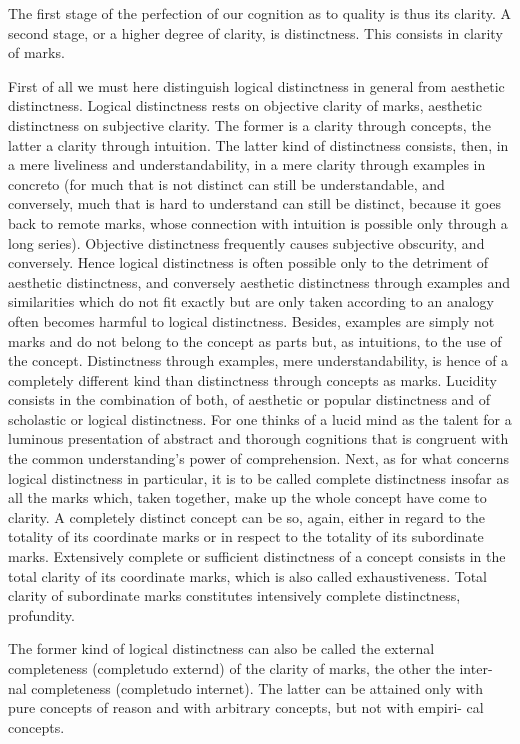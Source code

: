 The first stage of the perfection of our cognition
as to quality is thus its clarity.
A second stage, or a higher degree of clarity, is distinctness.
This consists in clarity of marks.

First of all we must here distinguish
logical distinctness in general from aesthetic distinctness.
Logical distinctness rests on objective clarity of marks,
aesthetic distinctness on subjective clarity.
The former is a clarity through concepts,
the latter a clarity through intuition.
The latter kind of distinctness consists, then,
in a mere liveliness and understandability,
in a mere clarity through examples in concreto
(for much that is not distinct
can still be understandable,
and conversely, much that is hard to understand
can still be distinct,
because it goes back to remote marks,
whose connection with intuition
is possible only through a long series).
Objective distinctness frequently causes
subjective obscurity, and conversely.
Hence logical distinctness is often possible
only to the detriment of aesthetic distinctness,
and conversely aesthetic distinctness
through examples and similarities
which do not fit exactly but are only
taken according to an analogy often becomes harmful to logical distinctness.
Besides, examples are simply not marks and do not belong to the
concept as parts but, as intuitions, to the use of the concept.
Distinctness through examples, mere understandability, is hence
of a completely different kind than distinctness through concepts as marks.
Lucidity consists in the combination of both,
of aesthetic or popular distinctness and
of scholastic or logical distinctness.
For one thinks of a lucid mind as the talent for a
luminous presentation of abstract and thorough cognitions
that is congruent with the common understanding's power of comprehension.
Next, as for what concerns logical distinctness in particular,
it is to be called complete distinctness insofar as all the marks
which, taken together, make up the whole concept have come to clarity.
A completely distinct concept can be so, again,
either in regard to the totality of its coordinate marks or
in respect to the totality of its subordinate marks.
Extensively complete or sufficient distinctness of a concept
consists in the total clarity of its coordinate marks,
which is also called exhaustiveness.
Total clarity of subordinate marks constitutes
intensively complete distinctness, profundity.

The former kind of logical distinctness can also be called the external
completeness (completudo externd) of the clarity of marks, the other the inter-
nal completeness (completudo internet). The latter can be attained only with
pure concepts of reason and with arbitrary concepts, but not with empiri-
cal concepts.

